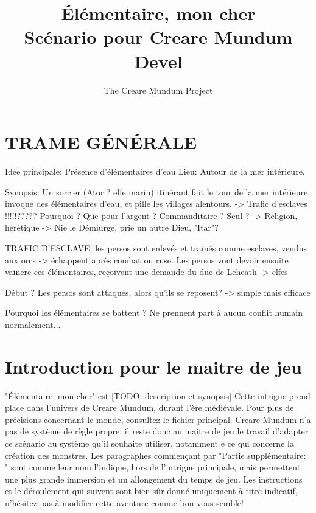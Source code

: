 \documentclass[a4paper]{article}
\title{Élémentaire, mon cher\\ Scénario pour Creare Mundum \\ Devel}
\author{The Creare Mundum Project}
\date{\oldstylenums{\insertdate}}
\begin{document}
\maketitle
\setcounter{tocdepth}{1} %
\renewcommand{\contentsname}{Sommaire} 
\tableofcontents
\newpage

\section*{TRAME GÉNÉRALE}
Idée principale: Présence d'élémentaires d'eau
\newline
Lieu: Autour de la mer intérieure.

Synopsis: Un sorcier (Ator ? elfe marin) itinérant fait le tour de la mer intérieure, invoque des élémentaires d'eau, et pille les villages alentours. -> Trafic d'esclaves !!!!!?????
Pourquoi ? Que pour l'argent ? Commanditaire ? Seul ?
-> Religion, hérétique -> Nie le Démiurge, prie un autre Dieu, "Itar"?

TRAFIC D'ESCLAVE: les persos sont enlevés et trainés comme esclaves, vendus aux orcs -> échappent après combat ou ruse.
\newline
Les persos vont devoir ensuite vaincre ces élémentaires, reçoivent une demande du duc de Leheath -> elfes

Début ? Les persos sont attaqués, alors qu'ils se reposent? -> simple mais efficace

Pourquoi les élémentaires se battent ? Ne prennent part à aucun conflit humain normalement...


\section{Introduction pour le maitre de jeu}
"Élémentaire, mon cher" est [TODO: description et synopsis]
\newline
Cette intrigue prend place dans l'univers de Creare Mundum, durant l'ère médiévale. Pour plus de précisions concernant le monde, consultez le fichier principal.
\newline
Creare Mundum n'a pas de système de règle propre, il reste donc au maitre de jeu le travail d'adapter ce scénario au système qu'il souhaite utiliser, notamment e ce qui concerne la création des monstres.
\newline
Les paragraphes commençant par "Partie supplémentaire: " sont comme leur nom l'indique, hors de l'intrigue principale, mais permettent une plus grande immersion et un allongement du temps de jeu.
\newline
Les instructions et le déroulement qui suivent sont bien sûr donné uniquement à titre indicatif, n'hésitez pas à modifier cette aventure comme bon vous semble!
\end{document}
